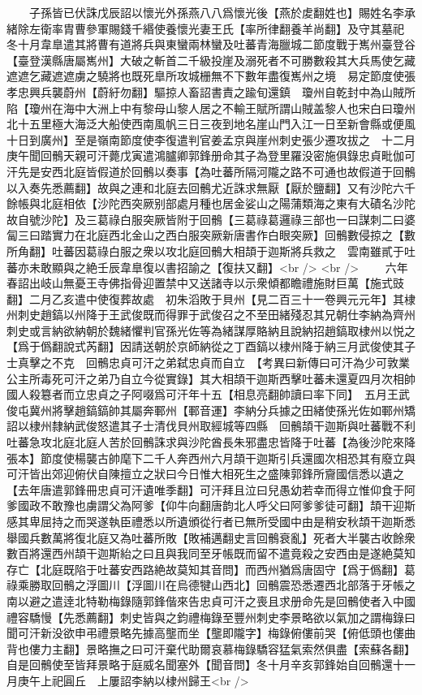 　　子孫皆已伏誅戊辰詔以懷光外孫燕八八爲懷光後【燕於䖍翻姓也】賜姓名李承緒除左衛率胄曹參軍賜錢千緡使養懷光妻王氏【率所律翻養羊尚翻】及守其墓祀　冬十月韋臯遣其將曹有道將兵與東蠻兩林蠻及吐蕃青海臘城二節度戰于嶲州臺登谷【臺登漢縣唐屬嶲州】大破之斬首二千級投崖及溺死者不可勝數殺其大兵馬使乞藏遮遮乞藏遮遮虜之驍將也既死臯所攻城栅無不下數年盡復嶲州之境　易定節度使張孝忠興兵襲蔚州【蔚紆勿翻】驅掠人畜詔書責之踰旬還鎮　瓊州自乾封中為山賊所陷【瓊州在海中大洲上中有黎母山黎人居之不輸王賦所謂山賊盖黎人也宋白曰瓊州北十五里極大海泛大船使西南風帆三日三夜到地名崖山門入江一日至新會縣或便風十日到廣州】至是嶺南節度使李復遣判官姜孟京與崖州刺史張少遷攻拔之　十二月庚午聞回鶻天親可汗薨戊寅遣鴻臚卿郭鋒册命其子為登里羅没密施俱錄忠貞毗伽可汗先是安西北庭皆假道於回鶻以奏事【為吐蕃所隔河隴之路不可通也故假道于回鶻以入奏先悉薦翻】故與之連和北庭去回鶻尤近誅求無厭【厭於鹽翻】又有沙陀六千餘帳與北庭相依【沙陀西突厥别部處月種也居金娑山之陽蒲類海之東有大磧名沙陀故自號沙陀】及三葛祿白服突厥皆附于回鶻【三葛祿葛邏祿三部也一曰謀刺二曰婆匐三曰踏實力在北庭西北金山之西白服突厥新唐書作白眼突厥】回鶻數侵掠之【數所角翻】吐蕃因葛祿白服之衆以攻北庭回鶻大相頡于迦斯將兵救之　雲南雖貳于吐蕃亦未敢顯與之絶壬辰韋臯復以書招諭之【復扶又翻】<br />
<br />
　　六年春詔出岐山無憂王寺佛指骨迎置禁中又送諸寺以示衆傾都瞻禮施財巨萬【施式豉翻】二月乙亥遣中使復葬故處　初朱滔敗于貝州【見二百三十一卷興元元年】其棣州刺史趙鎬以州降于王武俊既而得罪于武俊召之不至田緒殘忍其兄朝仕李納為齊州刺史或言納欲納朝於魏緒懼判官孫光佐等為緒謀厚賂納且說納招趙鎬取棣州以悦之【爲于僞翻說式芮翻】因請送朝於京師納從之丁酉鎬以棣州降于納三月武俊使其子士真擊之不克　回鶻忠貞可汗之弟弑忠貞而自立　【考異曰新傳曰可汗為少可敦業公主所毒死可汗之弟乃自立今從實錄】其大相頡干迦斯西擊吐蕃未還夏四月次相帥國人殺簒者而立忠貞之子阿啜爲可汗年十五【相息亮翻帥讀曰率下同】　五月王武俊屯冀州將擊趙鎬鎬帥其屬奔鄆州【鄆音運】李納分兵據之田緒使孫光佐如鄆州矯詔以棣州隸納武俊怒遣其子士清伐貝州取經城等四縣　回鶻頡干迦斯與吐蕃戰不利吐蕃急攻北庭北庭人苦於回鶻誅求與沙陀酋長朱邪盡忠皆降于吐蕃【為後沙陀來降張本】節度使楊襲古帥麾下二千人奔西州六月頡干迦斯引兵還國次相恐其有廢立與可汗皆出郊迎俯伏自陳擅立之狀曰今日惟大相死生之盛陳郭鋒所齎國信悉以遺之【去年唐遣郭鋒冊忠貞可汗遺唯季翻】可汗拜且泣曰兒愚幼若幸而得立惟仰食于阿爹國政不敢豫也虜謂父為阿爹【仰牛向翻唐韵北人呼父曰阿爹爹徒可翻】頡干迎斯感其卑屈持之而哭遂執臣禮悉以所遺頒從行者已無所受國中由是稍安秋頡干迦斯悉舉國兵數萬將復北庭又為吐蕃所敗【敗補邁翻史言回鶻衰亂】死者大半襲古收餘衆數百將還西州頡干迦斯紿之曰且與我同至牙帳既而留不遣竟殺之安西由是遂絶莫知存亡【北庭既陷于吐蕃安西路絶故莫知其音問】而西州猶爲唐固守【爲于僞翻】葛祿乘勝取回鶻之浮圖川【浮圖川在烏德犍山西北】回鶻震恐悉遷西北部落于牙帳之南以避之遣逹北特勒梅錄隨郭鋒偕來告忠貞可汗之喪且求册命先是回鶻使者入中國禮容驕慢【先悉薦翻】刺史皆與之鈞禮梅錄至豐州刺史李景略欲以氣加之謂梅錄曰聞可汗新没欲申弔禮景略先據高壟而坐【壟即隴字】梅錄俯僂前哭【俯低頭也僂曲背也僂力主翻】景略撫之曰可汗棄代助爾哀慕梅錄驕容猛氣索然俱盡【索蘇各翻】自是回鶻使至皆拜景略于庭威名聞塞外【聞音問】冬十月辛亥郭鋒始自回鶻還十一月庚午上祀圓丘　上屢詔李納以棣州歸王<br />

